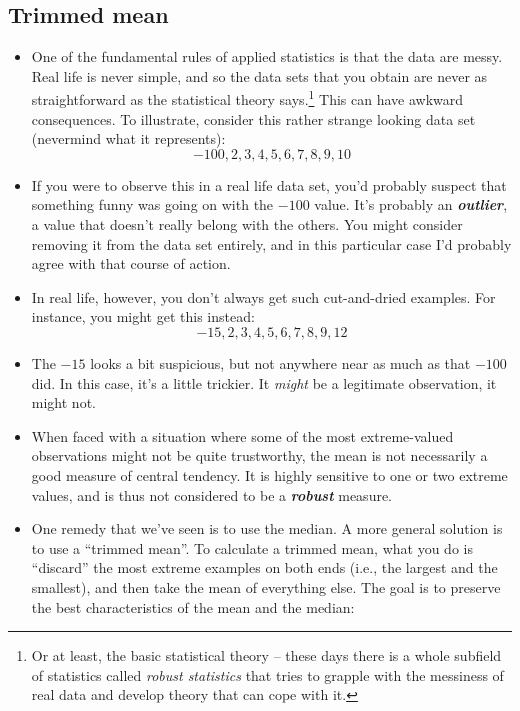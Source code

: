 \documentclass[
]{book}
\begin{document}
\hypertarget{trimmedmean}{%
\subsection{Trimmed mean}\label{trimmedmean}}

\begin{itemize}
\item
  One of the fundamental rules of applied statistics is that the data are messy. Real life is never simple, and so the data sets that you obtain are never as straightforward as the statistical theory says.\footnote{Or at least, the basic statistical theory -- these days there is a whole subfield of statistics called \emph{robust statistics} that tries to grapple with the messiness of real data and develop theory that can cope with it.} This can have awkward consequences. To illustrate, consider this rather strange looking data set (nevermind what it represents):
  \[
  -100,2,3,4,5,6,7,8,9,10
  \]
\item
  If you were to observe this in a real life data set, you'd probably suspect that something funny was going on with the \(-100\) value. It's probably an \textbf{\emph{outlier}}, a value that doesn't really belong with the others. You might consider removing it from the data set entirely, and in this particular case I'd probably agree with that course of action.
\item
  In real life, however, you don't always get such cut-and-dried examples. For instance, you might get this instead:
  \[
  -15,2,3,4,5,6,7,8,9,12
  \]
\item
  The \(-15\) looks a bit suspicious, but not anywhere near as much as that \(-100\) did. In this case, it's a little trickier. It \emph{might} be a legitimate observation, it might not.
\item
  When faced with a situation where some of the most extreme-valued observations might not be quite trustworthy, the mean is not necessarily a good measure of central tendency. It is highly sensitive to one or two extreme values, and is thus not considered to be a \textbf{\emph{robust}} measure.
\item
  One remedy that we've seen is to use the median. A more general solution is to use a ``trimmed mean''. To calculate a trimmed mean, what you do is ``discard'' the most extreme examples on both ends (i.e., the largest and the smallest), and then take the mean of everything else. The goal is to preserve the best characteristics of the mean and the median:


\end{itemize}
\end{document}
